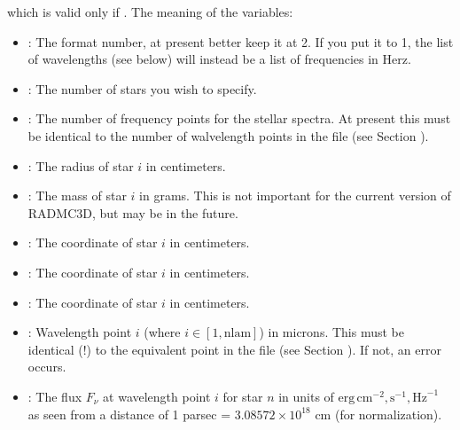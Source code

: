 \documentclass[letterpaper,10pt,english]{sphinxmanual}
\begin{document}
which is valid only if . The meaning of the variables:
\begin{itemize}
\item {} 
: The format number, at present better keep it at 2.
If you put it to 1, the list of wavelengths (see below) will instead be
a list of frequencies in Herz.

\item {} 
: The number of stars you wish to specify.

\item {} 
: The number of frequency points for the stellar
spectra. At present this must be identical to the number of walvelength
points in the file  (see Section {\hyperref[\detokenize{inputoutputfiles:sec-wavelengths}]{}}).

\item {} 
: The radius of star \(i\) in centimeters.

\item {} 
: The mass of star \(i\) in grams. This is not
important for the current version of RADMC\sphinxhyphen{}3D, but may be in the
future.

\item {} 
: The \sphinxhyphen{}coordinate of star \(i\) in centimeters.

\item {} 
: The \sphinxhyphen{}coordinate of star \(i\) in centimeters.

\item {} 
: The \sphinxhyphen{}coordinate of star \(i\) in centimeters.

\item {} 
: Wavelength point \(i\) (where \(i\in
[1,\mathrm{nlam}]\)) in microns. This must be identical (!) to the equivalent
point in the file  (see Section
{\hyperref[\detokenize{inputoutputfiles:sec-wavelengths}]{}}). If not, an error occurs.

\item {} 
: The flux \(F_\nu\) at wavelength point \(i\) for
star \(n\) in units of
\(\mathrm{erg}\,\mathrm{cm}^{-2},\mathrm{s}^{-1},\mathrm{Hz}^{-1}\) as
seen from a distance of 1 parsec = \(3.08572\times 10^{18}\) cm (for
normalization).

\end{itemize}
\end{document}
